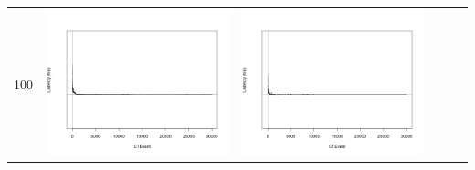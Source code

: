 \begin{table}[htbp]
{\begin{tabular}{l | ccccc}
		100	   & \begin{minipage}{.15\textwidth}\vspace{2pt}     							
     			 	\includegraphics[width=\linewidth]{images/lat-log-triple/I3}
    				 \end{minipage}
    			   & \begin{minipage}{.15\textwidth}\vspace{2pt}     							
     			 	\includegraphics[width=\linewidth]{images/lat-log-triple/I7}
    				 \end{minipage}
    			   &	 \begin{minipage}{.15\textwidth}\vspace{2pt}     							

\end{minipage}
\end{tabular}}
\end{table}
